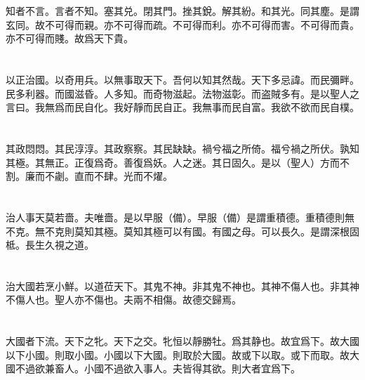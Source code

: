 \documentclass[a5paper]{ctexbook}
\begin{document}
    知者不言。言者不知。塞其兑。閉其門。挫其銳。解其紛。和其光。同其塵。是謂玄同。故不可得而親。亦不可得而疏。不可得而利。亦不可得而害。不可得而貴。亦不可得而賤。故爲天下貴。

    \chapter{}

    以正治國。以奇用兵。以無事取天下。吾何以知其然哉。天下多忌諱。而民彌畔。民多利器。而國滋昏。人多知。而奇物滋起。法物滋彰。而盗賊多有。是以聖人之言曰。我無爲而民自化。我好靜而民自正。我無事而民自富。我欲不欲而民自樸。

    \chapter{}

    其政悶悶。其民淳淳。其政察察。其民缺缺。禍兮福之所倚。福兮禍之所伏。孰知其極。其無正。正復爲奇。善復爲妖。人之迷。其日固久。是以（聖人）方而不割。廉而不劌。直而不肆。光而不燿。

    \chapter{}

    治人事天莫若嗇。夫唯嗇。是以早服（備）。早服（備）是謂重積德。重積德則無不克。無不克則莫知其極。莫知其極可以有國。有國之母。可以長久。是謂深根固柢。長生久視之道。

    \chapter{}

    治大國若烹小鮮。以道莅天下。其鬼不神。非其鬼不神也。其神不傷人也。非其神不傷人也。聖人亦不傷也。夫兩不相傷。故德交歸焉。

    \chapter{}

    大國者下流。天下之牝。天下之交。牝恒以靜勝牡。爲其静也。故宜爲下。故大國以下小國。則取小國。小國以下大國。則取於大國。故或下以取。或下而取。故大國不過欲兼畜人。小國不過欲入事人。夫皆得其欲。則大者宜爲下。

    \chapter{}
\end{document}
